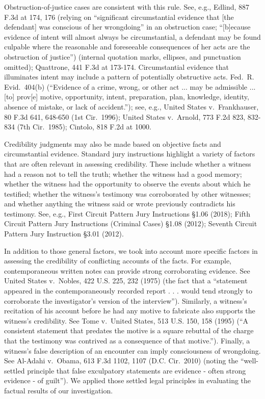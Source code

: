 Obstruction-of-justice cases are consistent with this rule.
See, e.g., Edlind, 887 F.3d at 174, 176 (relying on “significant circumstantial evidence that [the defendant] was conscious of her wrongdoing” in an obstruction case; “[b]ecause evidence of intent will almost always be circumstantial, a defendant may be found culpable where the reasonable and foreseeable consequences of her acts are the obstruction of justice”) (internal quotation marks, ellipses, and punctuation omitted);
Quattrone, 441 F.3d at 173-174.
Circumstantial evidence that illuminates intent may include a pattern of potentially obstructive acts. Fed.~R. Evid.~404(b) (“Evidence of a crime, wrong, or other act ... may be admissible ... [to] prov[e] motive, opportunity, intent, preparation, plan, knowledge, identity, absence of mistake, or lack of accident.”);
see, e.g., United States v.\ Frankhauser, 80 F.3d 641, 648-650 (1st Cir.~1996);
United States v.\ Arnold, 773 F.2d 823, 832-834 (7th Cir.~1985);
Cintolo, 818 F.2d at 1000.

Credibility judgments may also be made based on objective facts and circumstantial evidence.
Standard jury instructions highlight a variety of factors that are often relevant in assessing credibility.
These include whether a witness had a reason not to tell the truth; whether the witness had a good memory;
whether the witness had the opportunity to observe the events about which he testified;
whether the witness’s testimony was corroborated by other witnesses;
and whether anything the witness said or wrote previously contradicts his testimony.
See, e.g., First Circuit Pattern Jury Instructions \S 1.06 (2018);
Fifth Circuit Pattern Jury Instructions (Criminal Cases) \S 1.08 (2012);
Seventh Circuit Pattern Jury Instruction \S 3.01 (2012).

In addition to those general factors, we took into account more specific factors in assessing the credibility of conflicting accounts of the facts.
For example, contemporaneous written notes can provide strong corroborating evidence. See United States v.\ Nobles, 422 U.S. 225, 232 (1975) (the fact that a “statement appeared in the contemporaneously recorded report . . . would tend strongly to corroborate the investigator’s version of the interview”).
Similarly, a witness’s recitation of his account before he had any motive to fabricate also supports the witness’s credibility.
See Tome v.\ United States, 513 U.S. 150, 158 (1995) (“A consistent statement that predates the motive is a square rebuttal of the charge that the testimony was contrived as a consequence of that motive.”).
Finally, a witness’s false description of an encounter can imply consciousness of wrongdoing.
See Al-Adahi v.\ Obama, 613 F.3d 1102, 1107 (D.C. Cir.~2010) (noting the “well-settled principle that false exculpatory statements are evidence - often strong evidence - of guilt”).
We applied those settled legal principles in evaluating the factual results of our investigation.
